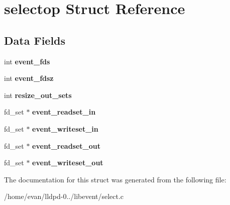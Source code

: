 \section{selectop \-Struct \-Reference}
\label{structselectop}
\subsection*{\-Data \-Fields}
\begin{DoxyCompactItemize}
\item 
int {\bfseries event\-\_\-fds}\label{structselectop_a9fc6c40de4a265a3dd185b6b36ddecfa}

\item 
int {\bfseries event\-\_\-fdsz}\label{structselectop_a1a36405ce31a5e6aeb2460e0b4bab789}

\item 
int {\bfseries resize\-\_\-out\-\_\-sets}\label{structselectop_a914892771eae5611fe3d64240c974d24}

\item 
fd\-\_\-set $\ast$ {\bfseries event\-\_\-readset\-\_\-in}\label{structselectop_a0616823afefd3e904c2b9153d1d92c59}

\item 
fd\-\_\-set $\ast$ {\bfseries event\-\_\-writeset\-\_\-in}\label{structselectop_af6a3c4073968a288427dd5a22aa7c2b6}

\item 
fd\-\_\-set $\ast$ {\bfseries event\-\_\-readset\-\_\-out}\label{structselectop_a0b276556c7669065b65385fc4163b8ed}

\item 
fd\-\_\-set $\ast$ {\bfseries event\-\_\-writeset\-\_\-out}\label{structselectop_aa9592df84382092b8eda951dad265a30}

\end{DoxyCompactItemize}


\-The documentation for this struct was generated from the following file\-:\begin{DoxyCompactItemize}
\item 
/home/evan/lldpd-\/0../libevent/select.\-c\end{DoxyCompactItemize}
